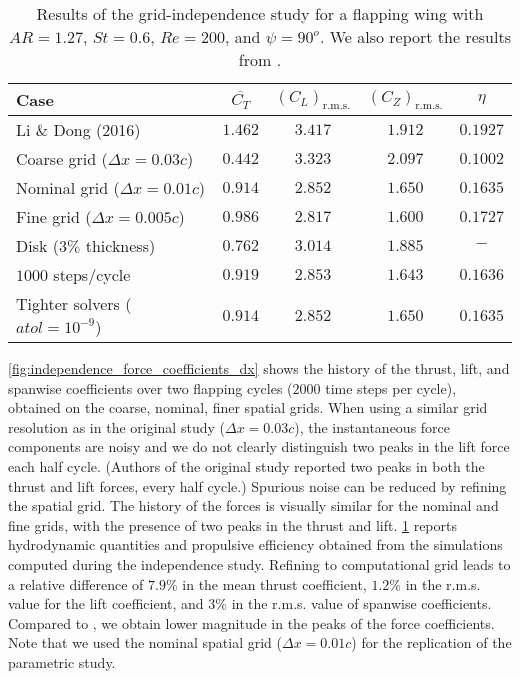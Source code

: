 \begin{table}[!h]
  \centering
  \begin{tabular}{lcccc}
    \hline\hline
    Case & $\overline{C_T}$ & $\left( C_L \right)_\text{r.m.s.}$ & $\left( C_Z \right)_\text{r.m.s.}$ & $\eta$ \\
    \hline
    Li \& Dong (2016) & $1.462$ & $3.417$ & $1.912$ & $0.1927$ \\
    Coarse grid ($\Delta x = 0.03c$) & $0.442$ & $3.323$ & $2.097$ & $0.1002$ \\
    Nominal grid ($\Delta x = 0.01c$) & $0.914$ & $2.852$ & $1.650$ & $0.1635$ \\
    Fine grid ($\Delta x = 0.005c$) & $0.986$ & $2.817$ & $1.600$ & $0.1727$ \\
    Disk ($3\%$ thickness) & $0.762$ & $3.014$ & $1.885$ & $-$ \\
    $1000$ steps/cycle & $0.919$ & $2.853$ & $1.643$ & $0.1636$ \\
    Tighter solvers ($atol = 10^{-9}$) & $0.914$ & $2.852$ & $1.650$ & $0.1635$ \\
    \hline\hline
  \end{tabular}
  \caption{Results of the grid-independence study for a flapping wing with $AR = 1.27$, $St = 0.6$, $Re = 200$, and $\psi = 90^o$. We also report the results from \citet{li_dong_2016}.}
  \label{tab:independence_results}
\end{table}

\cref{fig:independence_force_coefficients_dx} shows the history of the thrust, lift, and spanwise coefficients over two flapping cycles ($2000$ time steps per cycle), obtained on the coarse, nominal, finer spatial grids.
When using a similar grid resolution as in the original study ($\Delta x = 0.03c$), the instantaneous force components are noisy and we do not clearly distinguish two peaks in the lift force each half cycle.
(Authors of the original study reported two peaks in both the thrust and lift forces, every half cycle.)
Spurious noise can be reduced by refining the spatial grid.
The history of the forces is visually similar for the nominal and fine grids, with the presence of two peaks in the thrust and lift.
\cref{tab:independence_results} reports hydrodynamic quantities and propulsive efficiency obtained from the simulations computed during the independence study.
Refining to computational grid leads to a relative difference of $7.9\%$ in the mean thrust coefficient, $1.2\%$ in the r.m.s. value for the lift coefficient, and $3\%$ in the r.m.s. value of spanwise coefficients.
Compared to \citet{li_dong_2016}, we obtain lower magnitude in the peaks of the force coefficients.
Note that we used the nominal spatial grid ($\Delta x = 0.01c$) for the replication of the parametric study.

